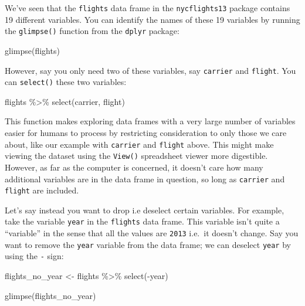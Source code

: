 \documentclass[
  letterpaper,
  DIV=11,
  numbers=noendperiod]{scrreprt}
\newenvironment{Shaded}{\begin{snugshade}}{\end{snugshade}}
\newcommand{\FunctionTok}[1]{\textcolor[rgb]{0.28,0.35,0.67}{#1}}
\newcommand{\NormalTok}[1]{\textcolor[rgb]{0.00,0.23,0.31}{#1}}
\newcommand{\OtherTok}[1]{\textcolor[rgb]{0.00,0.23,0.31}{#1}}
\newcommand{\SpecialCharTok}[1]{\textcolor[rgb]{0.37,0.37,0.37}{#1}}
\theoremstyle{definition}
\theoremstyle{remark}
\begin{document}
We've seen that the \texttt{flights} data frame in the
\texttt{nycflights13} package contains 19 different variables. You can
identify the names of these 19 variables by running the
\texttt{glimpse()} function from the \texttt{dplyr} package:

\begin{Shaded}
\begin{Highlighting}[]
\FunctionTok{glimpse}\NormalTok{(flights)}
\end{Highlighting}
\end{Shaded}

However, say you only need two of these variables, say \texttt{carrier}
and \texttt{flight}. You can \texttt{select()} these two variables:

\begin{Shaded}
\begin{Highlighting}[]
\NormalTok{flights }\SpecialCharTok{\%\textgreater{}\%} 
  \FunctionTok{select}\NormalTok{(carrier, flight)}
\end{Highlighting}
\end{Shaded}

This function makes exploring data frames with a very large number of
variables easier for humans to process by restricting consideration to
only those we care about, like our example with \texttt{carrier} and
\texttt{flight} above. This might make viewing the dataset using the
\texttt{View()} spreadsheet viewer more digestible. However, as far as
the computer is concerned, it doesn't care how many additional variables
are in the data frame in question, so long as \texttt{carrier} and
\texttt{flight} are included.

Let's say instead you want to drop i.e deselect certain variables. For
example, take the variable \texttt{year} in the \texttt{flights} data
frame. This variable isn't quite a ``variable'' in the sense that all
the values are \texttt{2013} i.e.~it doesn't change. Say you want to
remove the \texttt{year} variable from the data frame; we can deselect
\texttt{year} by using the \texttt{-} sign:

\begin{Shaded}
\begin{Highlighting}[]
\NormalTok{flights\_no\_year }\OtherTok{\textless{}{-}}\NormalTok{ flights }\SpecialCharTok{\%\textgreater{}\%} 
  \FunctionTok{select}\NormalTok{(}\SpecialCharTok{{-}}\NormalTok{year)}

\FunctionTok{glimpse}\NormalTok{(flights\_no\_year)}
\end{Highlighting}
\end{Shaded}
\end{document}
